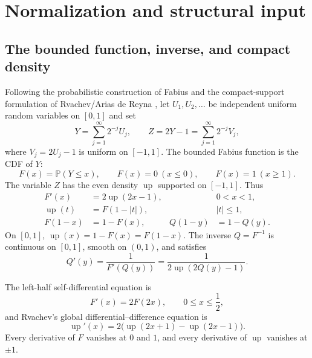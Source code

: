 \documentclass[11pt,oneside]{article}
\numberwithin{equation}{section}
\theoremstyle{plain}
\theoremstyle{definition}
\theoremstyle{remark}
\newcommand{\Prob}{\mathbb P}
\newcommand{\Up}{\operatorname{up}}
\begin{document}
\section{Normalization and structural input}
\label{sec:normalization}

\subsection{The bounded function, inverse, and compact density}

Following the probabilistic construction of Fabius and the compact-support
formulation of Rvachev/Arias de Reyna \cite{Fabius1966,Arias1982,Arias2017},
let $U_1,U_2,\ldots$ be independent uniform random variables on $[0,1]$ and
set
\begin{equation}
  Y=\sum_{j=1}^{\infty}2^{-j}U_j,
  \qquad
  Z=2Y-1=\sum_{j=1}^{\infty}2^{-j}V_j,
  \label{eq:random-series}
\end{equation}
where $V_j=2U_j-1$ is uniform on $[-1,1]$.  The bounded Fabius function is the
CDF of $Y$:
\begin{equation}
 F(x)=\Prob(Y\le x),
 \qquad
 F(x)=0\ (x\le0),
 \qquad
 F(x)=1\ (x\ge1).
 \label{eq:F-cdf}
\end{equation}
The variable $Z$ has the even density $\Up$ supported on $[-1,1]$.  Thus
\begin{align}
 F'(x)&=2\Up(2x-1), &&0<x<1,\label{eq:Fprime-up}\\
 \Up(t)&=F(1-|t|), &&|t|\le1,\label{eq:up-F}\\
 F(1-x)&=1-F(x),& Q(1-y)&=1-Q(y).\label{eq:symmetry}
\end{align}
On $[0,1]$, $\Up(x)=1-F(x)=F(1-x)$.  The inverse
$Q=F^{-1}$ is continuous on $[0,1]$, smooth on $(0,1)$, and satisfies
\begin{equation}
 Q'(y)=\frac1{F'(Q(y))}
      =\frac1{2\Up(2Q(y)-1)}.
 \label{eq:Qprime}
\end{equation}

The left-half self-differential equation is
\begin{equation}
 F'(x)=2F(2x),\qquad 0\le x\le\frac12,
 \label{eq:F-selfdiff}
\end{equation}
and Rvachev's global differential--difference equation is
\begin{equation}
 \Up'(x)=2\bigl(\Up(2x+1)-\Up(2x-1)\bigr).
 \label{eq:up-dde}
\end{equation}
Every derivative of $F$ vanishes at $0$ and $1$, and every derivative of
$\Up$ vanishes at $\pm1$.
\end{document}
